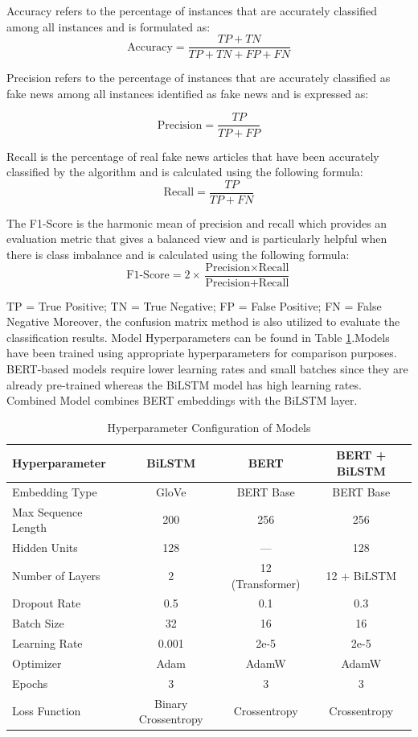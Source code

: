 \documentclass[runningheads]{llncs}
\begin{document}
Accuracy refers to the percentage of instances that are accurately classified among all instances and is formulated as:
\[
\text{Accuracy} = \frac{TP + TN}{TP + TN + FP + FN}
\]

Precision refers to the percentage of instances that are accurately classified as fake news among all instances identified as fake news and is expressed as:

\[
\text{Precision} = \frac{TP}{TP + FP}
\]

Recall is the percentage of real fake news articles that have been accurately classified by the algorithm and is calculated using the following formula:
\[
\text{Recall} = \frac{TP}{TP + FN}
\]

The F1-Score is the harmonic mean of precision and recall which provides an evaluation metric that gives a balanced view and is particularly helpful when there is class imbalance and is calculated using the following formula:
\[
\text{F1-Score} = 2 \times \frac{\text{Precision} \times \text{Recall}}{\text{Precision} + \text{Recall}}
\]

TP = True Positive; TN = True Negative; FP = False Positive; FN = False Negative
Moreover, the confusion matrix method is also utilized to evaluate the classification results.
Model Hyperparameters can be found in Table \ref{tab:hyperparameters}.Models have been trained using appropriate hyperparameters for comparison purposes. BERT-based models require lower learning rates and small batches since they are already pre-trained whereas the BiLSTM model has high learning rates. Combined Model combines BERT embeddings with the BiLSTM layer.

\begin{table}[H]
\centering
\caption{Hyperparameter Configuration of Models}
\label{tab:hyperparameters}
\small
\begin{tabular}{|l|c|c|c|}
\hline
\textbf{Hyperparameter} & \textbf{BiLSTM} & \textbf{BERT} & \textbf{BERT + BiLSTM} \\ \hline
Embedding Type & GloVe & BERT Base & BERT Base \\ \hline
Max Sequence Length & 200 & 256 & 256 \\ \hline
Hidden Units & 128 & --- & 128 \\ \hline
Number of Layers & 2 & 12 (Transformer) & 12 + BiLSTM \\ \hline
Dropout Rate & 0.5 & 0.1 & 0.3 \\ \hline
Batch Size & 32 & 16 & 16 \\ \hline
Learning Rate & 0.001 & 2e-5 & 2e-5 \\ \hline
Optimizer & Adam & AdamW & AdamW \\ \hline
Epochs & 3 & 3 & 3 \\ \hline
Loss Function & Binary Crossentropy & Crossentropy & Crossentropy \\ \hline
\end{tabular}
\end{table}
\end{document}
